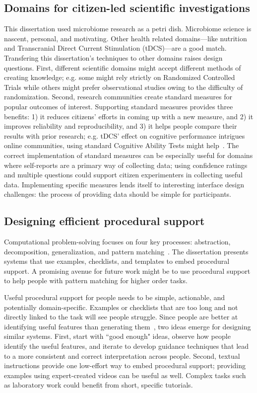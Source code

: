 \subsection{Domains for citizen-led scientific investigations}
This dissertation used microbiome research as a petri dish. Microbiome science is nascent, personal, and motivating. Other health related domains---like nutrition and Transcranial Direct Current Stimulation (tDCS)---are a good match. Transfering this dissertation's techniques to other domains raises design questions. First, different scientific domains might accept different methods of creating knowledge; e.g. some might rely strictly on Randomized Controlled Trials while others might prefer observational studies owing to the difficulty of randomization. Second, research communities create standard measures for popular outcomes of interest. Supporting standard measures provides three benefits: 1) it reduces citizens' efforts in coming up with a new measure, and 2) it improves reliability and reproducibility, and 3) it helps people compare their results with prior research; e.g. tDCS' effect on cognitive performance intrigues online communities, using standard Cognitive Ability Tests might help~\cite{macan1994effects}. The correct implementation of standard measures can be especially useful for domains where self-reports are a primary way of collecting data; using confidence ratings and multiple questions could support citizen experimenters in collecting useful data. Implementing specific measures lends itself to interesting interface design challenges: the process of providing data should be simple for participants.

\subsection{Designing efficient procedural support}
Computational problem-solving focuses on four key processes: abstraction, decomposition, generalization, and pattern matching~\cite{Wing2006}. The dissertation presents systems that use examples, checklists, and templates to embed procedural support. A promising avenue for future work might be to use procedural support to help people with pattern matching for higher order tasks.

Useful procedural support for people needs to be simple, actionable, and potentially domain-specific. Examples or checklists that are too long and not directly linked to the task will see people struggle. Since people are better at identifying useful features than generating them~\cite{Stahl2006}, two ideas emerge for designing similar systems. First, start with ``good enough" ideas, observe how people identify the useful features, and iterate to develop guidance techniques that lead to a more consistent and correct interpretation across people. Second, textual instructions provide one low-effort way to embed procedural support; providing examples using expert-created videos can be useful as well. Complex tasks such as laboratory work could benefit from short, specific tutorials.

